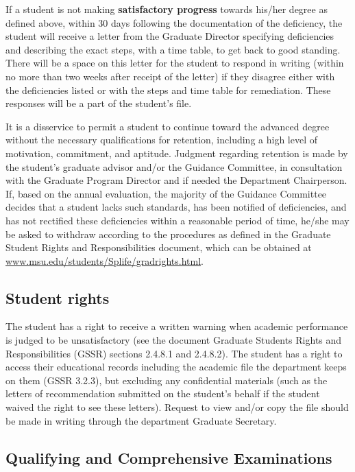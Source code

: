 If a student is not making \textbf{satisfactory progress} towards
his/her degree as defined above, within 30 days following the
documentation of the deficiency, the student will receive a letter
from the Graduate Director specifying deficiencies and describing the
exact steps, with a time table, to get back to good standing.  There
will be a space on this letter for the student to respond in writing
(within no more than two weeks after receipt of the letter)
if they disagree either with the deficiencies listed or with the steps
and time table for remediation. These responses will be a part of the
student's file.

It is a disservice to permit a student to continue toward the advanced
degree without the necessary qualifications for retention, including a
high level of motivation, commitment, and aptitude.  Judgment
regarding retention is made by the student's graduate advisor and/or
the Guidance Committee, in consultation with the Graduate Program
Director and if needed the Department Chairperson.  If, based on the
annual evaluation, the majority of the Guidance Committee decides that a
student lacks such standards, has been notified of deficiencies, and
has not rectified these deficiencies within a reasonable period of
time,
 he/she may be asked to withdraw
according to the procedures as defined in the Graduate Student Rights
and Responsibilities document, which can be obtained at
\url{www.msu.edu/students/Splife/gradrights.html}.

\subsection{Student rights}

The student has a right to receive a written warning when academic
performance is judged to be unsatisfactory (see the document Graduate
Students Rights and Responsibilities (GSSR) sections 2.4.8.1 and
2.4.8.2).  The student has a right to access their educational records
including the academic file the department keeps on them (GSSR 3.2.3),
but excluding any confidential materials (such as the letters of
recommendation submitted on the student's behalf if the student waived
the right to see these letters).  Request to view and/or copy the file
should be made in writing through the department Graduate Secretary.

\subsection{Qualifying and Comprehensive Examinations}

